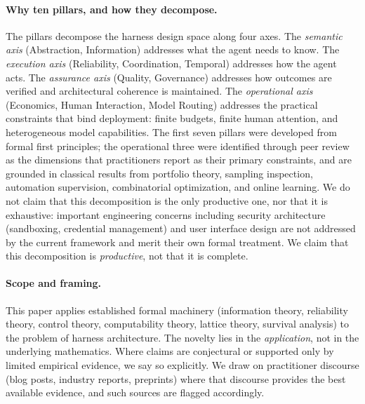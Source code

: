 \documentclass[11pt, a4paper]{googledeepmind}
\begin{document}
\paragraph{Why ten pillars, and how they decompose.} The pillars decompose the harness design space along four axes. The \emph{semantic axis} (Abstraction, Information) addresses what the agent needs to know. The \emph{execution axis} (Reliability, Coordination, Temporal) addresses how the agent acts. The \emph{assurance axis} (Quality, Governance) addresses how outcomes are verified and architectural coherence is maintained. The \emph{operational axis} (Economics, Human Interaction, Model Routing) addresses the practical constraints that bind deployment: finite budgets, finite human attention, and heterogeneous model capabilities. The first seven pillars were developed from formal first principles; the operational three were identified through peer review as the dimensions that practitioners report as their primary constraints, and are grounded in classical results from portfolio theory, sampling inspection, automation supervision, combinatorial optimization, and online learning. We do not claim that this decomposition is the only productive one, nor that it is exhaustive: important engineering concerns including security architecture (sandboxing, credential management) and user interface design are not addressed by the current framework and merit their own formal treatment. We claim that this decomposition is \emph{productive}, not that it is complete.

\paragraph{Scope and framing.} This paper applies established formal machinery (information theory, reliability theory, control theory, computability theory, lattice theory, survival analysis) to the problem of harness architecture. The novelty lies in the \emph{application}, not in the underlying mathematics. Where claims are conjectural or supported only by limited empirical evidence, we say so explicitly. We draw on practitioner discourse (blog posts, industry reports, preprints) where that discourse provides the best available evidence, and such sources are flagged accordingly.
\end{document}
